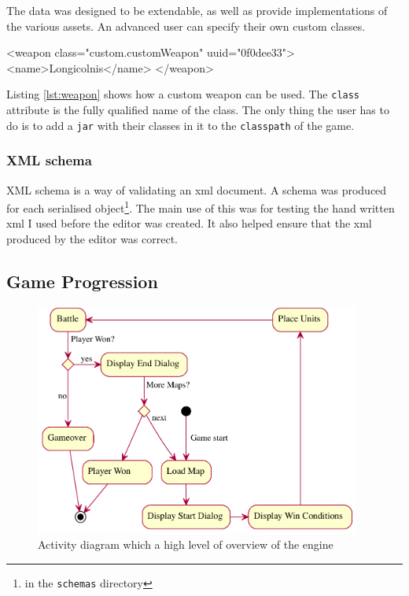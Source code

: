 The data was designed to be extendable, as well as provide implementations of the various assets. An advanced user can specify their own custom classes.

\begin{lst:weapon}[caption=Example of Custom weapon, label=lst:weapon]
<weapon class="custom.customWeapon" uuid="0f0dee33">
	<name>Longicolnis</name>
</weapon>
\end{lst:weapon}

Listing \ref{lst:weapon} shows how a custom weapon can be used. The \texttt{class} attribute is  the fully qualified name of the class. The only thing the user has to do is to add a \texttt{jar} with their classes in it to the \texttt{classpath} of the game. 

\subsubsection{XML schema}

XML schema is a way of validating an  xml document. A schema was produced for each serialised object\footnote{in the \texttt{schemas} directory}. 
The main use of this was for testing the hand written xml I used before the editor was created. It also helped ensure that the xml produced by the editor was correct.  

\subsection{Game Progression}
\begin{figure}[htbp]
	\centering
		\includegraphics[height=3in]{figures/game.pdf}
	\caption{Activity diagram which a high level of overview of the engine}
	\label{fig:figures_game}
\end{figure}

